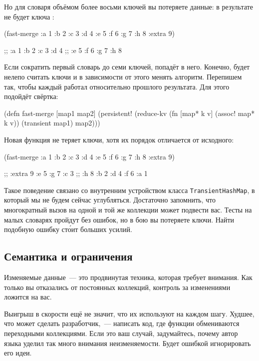 Но для словаря объёмом более восьми ключей вы потеряете данные: в результате не
будет ключа :

\begin{clojure}
(fast-merge
 {:a 1 :b 2 :c 3 :d 4 :e 5 :f 6 :g 7 :h 8}
 {:extra 9})

;; {:a 1 :b 2 :c 3 :d 4
;;  :e 5 :f 6 :g 7 :h 8}
\end{clojure}

Если сократить первый словарь до семи ключей,  попадёт в
него. Конечно, будет нелепо считать ключи и в зависимости от этого менять
алгоритм. Перепишем  так, чтобы каждый  работал
относительно прошлого результата. Для этого подойдёт свёртка:

\begin{clojure}
(defn fast-merge [map1 map2]
  (persistent!
   (reduce-kv
    (fn [map* k v]
      (assoc! map* k v))
    (transient map1)
    map2)))
\end{clojure}

Новая функция не теряет ключи, хотя их порядок отличается от исходного:

\begin{clojure}
(fast-merge
 {:a 1 :b 2 :c 3 :d 4 :e 5 :f 6 :g 7 :h 8}
 {:extra 9})

;; {:extra 9 :e 5 :g 7 :c 3
;;  :h 8 :b 2 :d 4 :f 6 :a 1}
\end{clojure}

Такое поведение связано со внутренним устройством класса
\texttt{Tran\-si\-ent\-Hash\-Map}, в который мы не будем сейчас
углубляться. Достаточно запомнить, что многократный вызов  на одной
и той же коллекции может подвести вас. Тесты на малых словарях пройдут без
ошибок, но в бою вы потеряете ключи. Найти подобную ошибку ст\'{о}ит больших усилий.

\subsection{Семантика и ограничения}

Изменяемые данные~--- это продвинутая техника, которая требует внимания. Как только
вы отказались от постоянных коллекций, контроль за изменениями ложится на вас.

Выигрыш в скорости ещё не значит, что их используют на каждом шагу. Худшее, что
может сделать разработчик,~--- написать код, где функции обмениваются
переходными коллекциями. Если это ваш случай, задумайтесь, почему автор языка
уделил так много внимания неизменяемости. Будет ошибкой игнорировать его идеи.


